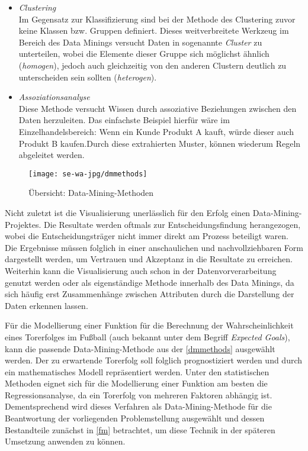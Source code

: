 \begin{itemize}
\item \textit{Clustering}
\\ Im Gegensatz zur Klassifizierung sind bei der Methode des Clustering zuvor keine Klassen bzw. Gruppen definiert. Dieses weitverbreitete Werkzeug im Bereich des Data Minings versucht Daten in sogenannte \textit{Cluster} zu unterteilen, wobei die Elemente dieser Gruppe sich möglichst ähnlich (\textit{homogen}), jedoch auch gleichzeitig von den anderen Clustern deutlich zu unterscheiden sein sollten (\textit{heterogen}).

\item \textit{Assoziationsanalyse}
\\ Diese Methode versucht Wissen durch assoziative Beziehungen zwischen den Daten herzuleiten. Das einfachste Beispiel hierfür wäre im Einzelhandelsbereich: \glqq Wenn ein Kunde Produkt A kauft, würde dieser auch Produkt B kaufen.\grqq Durch diese extrahierten Muster, können wiederum Regeln abgeleitet werden.
\end{itemize}

\begin{sidewaysfigure}
\centering
\texttt{[image: se-wa-jpg/dmmethods]}
\caption[Übersicht: Data-Mining-Methoden]{Übersicht: Data-Mining-Methoden\protect\footnotemark}
\label{dmmethods}	
\end{sidewaysfigure}

Nicht zuletzt ist die Visualisierung unerlässlich für den Erfolg einen Data-Mining-Projektes. Die Resultate werden oftmals zur Entscheidungsfindung herangezogen, wobei die Entscheidungsträger nicht immer direkt am Prozess beteiligt waren. Die Ergebnisse müssen folglich in einer anschaulichen und nachvollziehbaren Form dargestellt werden, um Vertrauen und Akzeptanz in die Resultate zu erreichen. Weiterhin kann die Visualisierung auch schon in der Datenvorverarbeitung genutzt werden oder als eigenständige Methode innerhalb des Data Minings, da sich häufig erst Zusammenhänge zwischen Attributen durch die Darstellung der Daten erkennen lassen.

Für die Modellierung einer Funktion für die Berechnung der Wahrscheinlichkeit eines Torerfolges im Fußball (auch bekannt unter dem Begriff \textit{Expected Goals}), kann die passende Data-Mining-Methode aus der \vref{dmmethods} ausgewählt werden. Der zu erwartende Torerfolg soll folglich prognostiziert werden und durch ein mathematisches Modell repräsentiert werden. Unter den statistischen Methoden eignet sich für die Modellierung einer Funktion am besten die Regressionsanalyse, da ein Torerfolg von mehreren Faktoren abhängig ist. Dementsprechend wird dieses Verfahren als Data-Mining-Methode für die Beantwortung der vorliegenden Problemstellung ausgewählt und dessen Bestandteile zunächst in \vref{fm} betrachtet, um diese Technik in der späteren Umsetzung anwenden zu können.	